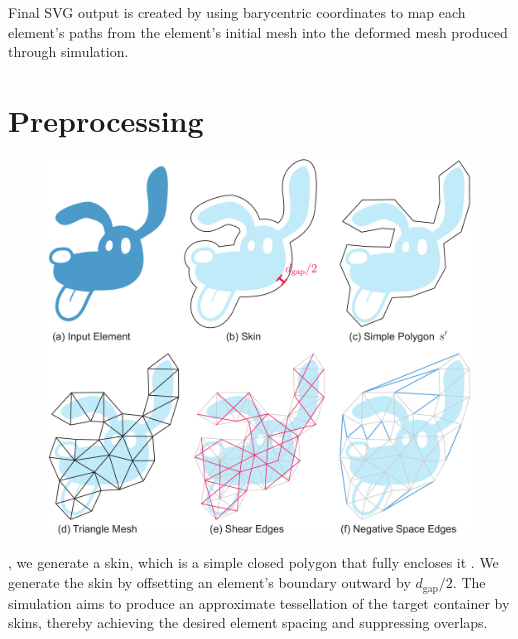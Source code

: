 Final SVG output is created by using barycentric coordinates to map each element's
paths from the element's initial mesh into the deformed mesh produced through
simulation. 


\section{Preprocessing}
\label{repulsionpak_preprocessing}

\begin{figure} %
\centering
\includegraphics[width=1.0\textwidth]{figures/repulsionpak/element_skin_triangles_4.pdf}
\caption[Element discretization]{
	\label{fig_elements_image}
}
\end{figure}





, we generate a skin, 
which is a simple closed polygon that fully encloses it .
We generate the skin by offsetting 
an element's boundary outward by $d_\mathrm{gap}/2$. 
The simulation aims to produce an approximate tessellation of the target
container by  skins, thereby achieving the desired element spacing and
suppressing overlaps.


